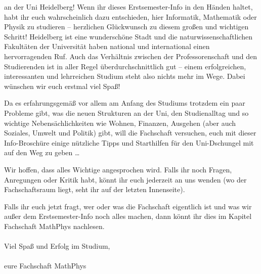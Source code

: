 an der Uni Heidelberg! Wenn ihr dieses Erstsemester-Info in den Händen haltet, habt ihr euch wahrscheinlich dazu entschieden, hier Informatik, Mathematik oder Physik zu studieren -- herzlichen Glückwunsch zu diesem großen und wichtigen Schritt! Heidelberg ist eine wunderschöne Stadt und die naturwissenschaftlichen Fakultäten der Universität haben national und international einen hervorragenden Ruf. Auch das Verhältnis zwischen der Professorenschaft und den Studierenden ist in aller Regel überdurchschnittlich gut -- einem erfolgreichen, interessanten und lehrreichen Studium steht also nichts mehr im Wege. Dabei wünschen wir euch erstmal viel Spaß! \smiley

Da es erfahrungsgemäß vor allem am Anfang des Studiums trotzdem ein paar Probleme gibt, was die neuen Strukturen an der Uni, den Studienalltag und so wichtige Nebensächlichkeiten wie Wohnen, Finanzen, Ausgehen (aber auch Soziales, Umwelt und Politik) gibt, will die Fachschaft versuchen, euch mit dieser Info-Broschüre einige nützliche Tipps und Starthilfen für den Uni-Dschungel mit auf den Weg zu geben \dots


Wir hoffen, dass alles Wichtige angesprochen wird. Falls ihr noch Fragen, Anregungen oder Kritik habt, könnt ihr euch jederzeit an uns wenden (wo der Fachschaftsraum liegt, seht ihr auf der letzten Innenseite).

Falls ihr euch jetzt fragt, wer oder was die Fachschaft eigentlich ist und was wir außer dem Erstsemester-Info noch alles machen, dann könnt ihr dies im Kapitel Fachschaft MathPhys nachlesen. \\\\ 
\noindent Viel Spaß und Erfolg im Studium,\\\\

eure Fachschaft MathPhys
